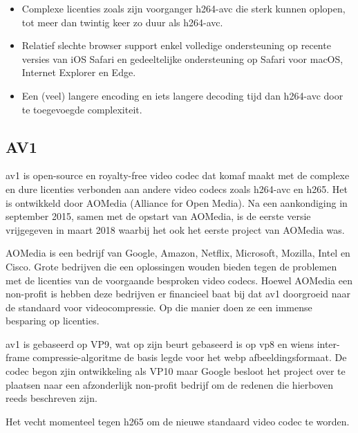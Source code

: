 \begin{itemize}
	
	\item Complexe licenties zoals zijn voorganger \gls{h264-avc} die sterk kunnen oplopen, tot meer dan twintig keer zo duur als \gls{h264-avc}.
	
	\item Relatief slechte browser support enkel volledige ondersteuning op recente versies van iOS Safari en gedeeltelijke ondersteuning op Safari voor macOS, Internet Explorer en Edge.
	
	\item Een (veel) langere \gls{encoding} en iets langere \gls{decoding} tijd dan \gls{h264-avc} door te toegevoegde complexiteit.
	
\end{itemize}

\subsection{AV1}
\label{sec:videocompressie-av1}

\Gls{av1} is \gls{open-source} en royalty-free video \gls{codec} dat komaf maakt met de complexe en dure licenties verbonden aan andere video \glspl{codec} zoals \gls{h264-avc} en \gls{h265}. Het is ontwikkeld door AOMedia (Alliance for Open Media). Na een aankondiging in september 2015, samen met de opstart van AOMedia, is de eerste versie vrijgegeven in maart 2018 waarbij het ook het eerste project van AOMedia was.

AOMedia is een bedrijf van Google, Amazon, Netflix, Microsoft, Mozilla, Intel en Cisco. Grote bedrijven die een oplossingen wouden bieden tegen de problemen met de licenties van de voorgaande besproken video \glspl{codec}. Hoewel AOMedia een non-profit is hebben deze bedrijven er financieel baat bij dat \gls{av1} doorgroeid naar de standaard voor \gls{videocompressie}. Op die manier doen ze een immense besparing op licenties.

\Gls{av1} is gebaseerd op VP9, wat op zijn beurt gebaseerd is op \gls{vp8} en wiens \gls{inter-frame} \gls{compressie-algoritme} de basis legde voor het \gls{webp} \gls{afbeeldingsformaat}. De \gls{codec} begon zjin ontwikkeling als VP10 maar Google besloot het project over te plaatsen naar een afzonderlijk non-profit bedrijf om de redenen die hierboven reeds beschreven zijn.

Het vecht momenteel tegen \gls{h265} om de nieuwe standaard video \gls{codec} te worden.

